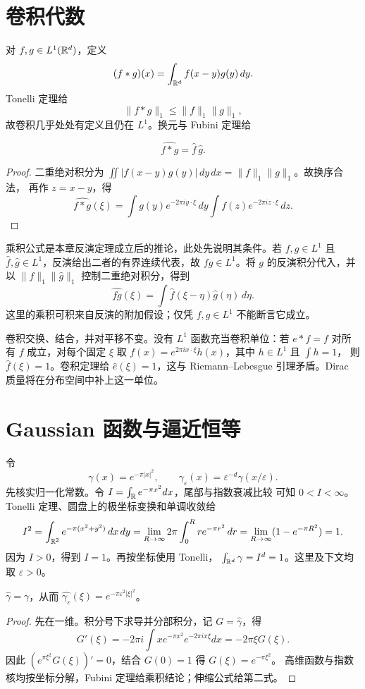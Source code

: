 \section{卷积代数}

对 \(f,g\in L^1(\mathbb{R}^d)\)，定义
\[
 (f*g)(x)=\int_{\mathbb{R}^d}f(x-y)g(y)\,dy.
\]
Tonelli 定理给
\[
 \|f*g\|_1\le\|f\|_1\|g\|_1,
\]
故卷积几乎处处有定义且仍在 \(L^1\)。换元与 Fubini 定理给
\begin{theorem}[卷积定理]\label{thm:fourier-convolution}
\[
 \widehat{f*g}=\widehat f\,\widehat g.
\]
\end{theorem}
\begin{proof}
二重绝对积分为
\(\iint|f(x-y)g(y)|\,dy\,dx=\|f\|_1\|g\|_1\)。故换序合法，
再作 \(z=x-y\)，得
\[
 \widehat{f*g}(\xi)
 =\int g(y)e^{-2\pi iy\cdot\xi}\,dy
   \int f(z)e^{-2\pi iz\cdot\xi}\,dz.
\]
\end{proof}
乘积公式是本章反演定理成立后的推论，此处先说明其条件。若 \(f,g\in L^1\) 且
\(\widehat f,\widehat g\in L^1\)，反演给出二者的有界连续代表，故
\(fg\in L^1\)。将 \(g\) 的反演积分代入，并以
\(\|f\|_1\|\widehat g\|_1\) 控制二重绝对积分，得到
\[
 \widehat{fg}(\xi)=\int\widehat f(\xi-\eta)\widehat g(\eta)\,d\eta.
\]
这里的乘积可积来自反演的附加假设；仅凭 \(f,g\in L^1\) 不能断言它成立。

卷积交换、结合，并对平移不变。没有 \(L^1\) 函数充当卷积单位：若
\(e*f=f\) 对所有 \(f\) 成立，对每个固定 \(\xi\) 取
\(f(x)=e^{2\pi ix\cdot\xi}h(x)\)，其中 \(h\in L^1\) 且 \(\int h=1\)，
则 \(\widehat f(\xi)=1\)。卷积定理给 \(\widehat e(\xi)=1\)，这与
Riemann--Lebesgue 引理矛盾。Dirac 质量将在分布空间中补上这一单位。

\section{Gaussian 函数与逼近恒等}

令
\[
 \gamma(x)=e^{-\pi|x|^2},\qquad
 \gamma_\varepsilon(x)=\varepsilon^{-d}\gamma(x/\varepsilon).
\]
先核实归一化常数。令 \(I=\int_{\mathbb{R}} e^{-\pi x^2}dx\)，尾部与指数衰减比较
可知 \(0<I<\infty\)。Tonelli 定理、圆盘上的极坐标变换和单调收敛给
\[
 I^2=\int_{\mathbb{R}^2}e^{-\pi(x^2+y^2)}\,dx\,dy
 =\lim_{R\to\infty}2\pi\int_0^R r e^{-\pi r^2}\,dr
 =\lim_{R\to\infty}(1-e^{-\pi R^2})=1.
\]
因为 \(I>0\)，得到 \(I=1\)。再按坐标使用 Tonelli，
\(\int_{\mathbb{R}^d}\gamma=I^d=1\)。这里及下文均取 \(\varepsilon>0\)。

\begin{proposition}\label{prop:gaussian-fourier}
\(\widehat\gamma=\gamma\)，从而
\(\widehat{\gamma_\varepsilon}(\xi)=e^{-\pi\varepsilon^2|\xi|^2}\)。
\end{proposition}
\begin{proof}
先在一维。积分号下求导并分部积分，记 \(G=\widehat\gamma\)，得
\[
 G'(\xi)=-2\pi i\int x e^{-\pi x^2}e^{-2\pi ix\xi}dx
 =-2\pi\xi G(\xi).
\]
因此 \((e^{\pi\xi^2}G(\xi))'=0\)，结合 \(G(0)=1\) 得
\(G(\xi)=e^{-\pi\xi^2}\)。
高维函数与指数核均按坐标分解，Fubini 定理给乘积结论；伸缩公式给第二式。
\end{proof}

